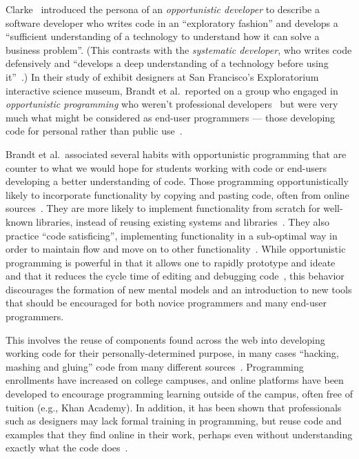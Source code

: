 \documentclass[12pt]{memoir}
\title{}
\author{Andrew Head}
\begin{document}


Clarke~\cite{clarke_what_2007} introduced the persona of an \emph{opportunistic developer} to describe a software developer who writes code in an ``exploratory fashion'' and develops a ``sufficient understanding of a technology to understand how it can solve a business problem''.
(This contrasts with the \emph{systematic developer}, who writes code defensively and ``develops a deep understanding of a technology before using it''~\cite{clarke_what_2007}.)
In their study of exhibit designers at San Francisco's Exploratorium interactive science museum, Brandt et al.\ reported on a group who engaged in \emph{opportunistic programming} who weren't professional developers~\cite{brandt_opportunistic_2008} but were very much what might be considered as end-user programmers --- those developing code for personal rather than public use~\cite{ko_state_2011}.

Brandt et al.\ associated several habits with opportunistic programming that are counter to what we would hope for students working with code or end-users developing a better understanding of code.
Those programming opportunistically likely to incorporate functionality by copying and pasting code, often from online sources~\cite{brandt_two_2009}.
They are more likely to implement functionality from scratch for well-known libraries, instead of reusing existing systems and libraries~\cite{brandt_opportunistic_2008}.
They also practice ``code satisficing'', implementing functionality in a sub-optimal way in order to maintain flow and move on to other functionality~\cite{brandt_opportunistic_2008}.
While opportunistic programming is powerful in that it allows one to rapidly prototype and ideate and that it reduces the cycle time of editing and debugging code~\cite{brandt_opportunistic_2008}, this behavior discourages the formation of new mental models and an introduction to new tools that should be encouraged for both novice programmers and many end-user programmers.

This involves the reuse of components found across the web into developing working code for their personally-determined purpose, in many cases ``hacking, mashing and gluing'' code from many different sources~\cite{hartmann_hacking_2008}.
Programming enrollments have increased on college campuses, and online platforms have been developed to encourage programming learning outside of the campus, often free of tuition (e.g., Khan Academy).
In addition, it has been shown that professionals such as designers may lack formal training in programming, but reuse code and examples that they find online in their work, perhaps even without understanding exactly what the code does~\cite{dorn_learning_2010}.
\fi
\end{document}

